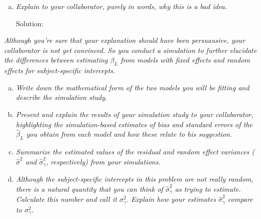 \documentclass[11pt, letterpaper]{article}
\begin{document}
\begin{enumerate}[(a)]
\addtocounter{enumi}{1}
\item{\em   Explain to your collaborator, purely in words, why this is a bad idea.}

  \begin{description}
  \item[Solution:] 
  \end{description}
  
\end{enumerate}

{\em Although you're sure that your explanation should have been persuausive, your collaborator is not yet convinced.  So you conduct a simulation to 
further elucidate the differences between estimating $\beta_L$ from models with
fixed effects and random effects for subject-specific intercepts.  }
\begin{enumerate}[(a)]
\addtocounter{enumi}{2}
\item {\em Write down the mathematical form of the two models you will be fitting and describe the simulation study.}


\item {\em  Present and explain the results of your simulation study to your collaborator, highlighting the simulation-based estimates of bias and standard errors of the $\hat{\beta}_L$ you obtain from each model and how these relate to his suggestion.}


\item {\em  Summarize the estimated values of the residual and random effect variances ($\hat{\sigma}^2$ and $\hat{\sigma}^2_\gamma$, respectively) from your simulations.}


\item {\em  Although the subject-specific intercepts in this problem are not really random, there is a natural quantity that you can think of $\hat{\sigma}^2_\gamma$ as trying to estimate.  Calculate this number and call
it $\sigma_\gamma^2$.  Explain how your estimates $\hat{\sigma}^2_\gamma$ compare to  $\sigma_\gamma^2$.}

\end{enumerate}
\end{document}
